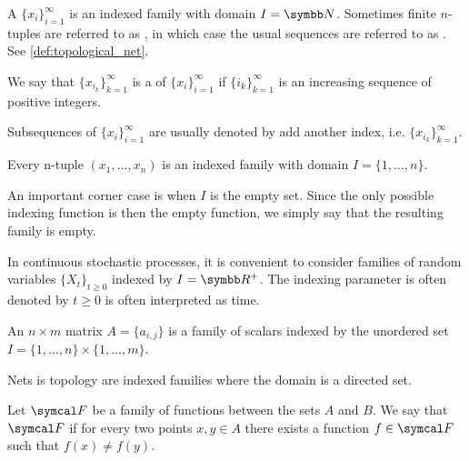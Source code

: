 \begin{definition}\label{def:sequence}
  A  \( \{ x_i \}_{i=1}^\infty \) is an indexed family with domain \( I = \BB N \). Sometimes finite \( n \)-tuples are referred to as , in which case the usual sequences are referred to as . See \cref{def:topological_net}.

  We say that \( \{ x_{i_k} \}_{k=1}^\infty \) is a  of \( \{ x_i \}_{i=1}^\infty \) if \( \{ i_k \}_{k=1}^\infty \) is an increasing sequence of positive integers.

  Subsequences of \( \{ x_i \}_{i=1}^\infty \) are usually denoted by add another index, i.e. \( \{ x_{i_k} \}_{k=1}^\infty \).
\end{definition}

\begin{example}\label{ex:indexed_families}
  \mbox{}
  \begin{defenum}
    \item Every n-tuple \( (x_1, \ldots, x_n) \) is an indexed family with domain \( I = \{ 1, \ldots, n \} \).

    \item An important corner case is when \( I \) is the empty set. Since the only possible indexing function is then the empty function, we simply say that the resulting family is empty.

    \item In continuous stochastic processes, it is convenient to consider families of random variables \( \{ X_t \}_{t \geq 0} \) indexed by \( I = \R^+ \). The indexing parameter is often denoted by \( t \geq 0 \) is often interpreted as time.

    \item An \( n \times m \) matrix \( A = \{ a_{i,j} \} \) is a family of scalars indexed by the unordered set \( I = \{ 1, \ldots, n \} \times \{ 1, \ldots, m \} \).

    \item Nets is topology are indexed families where the domain is a directed set.
  \end{defenum}
\end{example}

\begin{definition}\label{def:family_of_functions_separates_points}
  Let \( \Cal{F} \) be a family of functions between the sets \( A \) and \( B \). We say that \( \Cal{F} \)  if for every two points \( x, y \in A \) there exists a function \( f \in \Cal{F} \) such that \( f(x) \neq f(y) \).
\end{definition}
